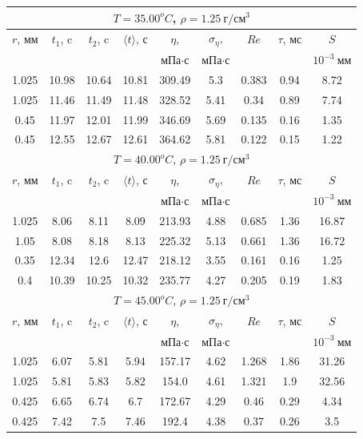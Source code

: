 \documentclass[12pt,a4paper]{article}
\begin{document}
\begin{table}[htp]
\begin{tabular}[]{|c|c|c|c|c|c|c|c|c|}
        \hline
        \multicolumn{9}{|c|}{$T = 35.00^oC$, $\rho = 1.25\ г/см^3$}\\
        \hline
        $r$, мм & $t_1$, c & $t_2$, c & $\langle t\rangle $, с & $\eta$,& $\sigma_{\eta}$,& $Re$ & $\tau$, мс & $S$\\
        &&&& мПа$\cdot$с & мПа$\cdot$с &&&$10^{-3}\ мм$\\
        \hline
        1.025  &  10.98 & 10.64 &  10.81  &  309.49  &  5.3  &  0.383  &  0.94  &  8.72 \\ 
        \hline
        1.025  &  11.46 & 11.49 &  11.48  &  328.52  &  5.41  &  0.34  &  0.89  &  7.74 \\ 
        \hline
        0.45  &  11.97 & 12.01 &  11.99  &  346.69  &  5.69  &  0.135  &  0.16  &  1.35 \\ 
        \hline
        0.45  &  12.55 & 12.67 &  12.61  &  364.62  &  5.81  &  0.122  &  0.15  &  1.22 \\ 
        \hline
        
        \hline
        \multicolumn{9}{|c|}{$T = 40.00^oC$, $\rho = 1.25\ г/см^3$}\\
        \hline
        $r$, мм & $t_1$, c & $t_2$, c & $\langle t\rangle $, с & $\eta$,& $\sigma_{\eta}$,& $Re$ & $\tau$, мс & $S$\\
        &&&& мПа$\cdot$с & мПа$\cdot$с &&&$10^{-3}\ мм$\\
        \hline
        1.025  &  8.06 & 8.11 &  8.09  &  213.93  &  4.88  &  0.685  &  1.36  &  16.87 \\ 
        \hline
        1.05  &  8.08 & 8.18 &  8.13  &  225.32  &  5.13  &  0.661  &  1.36  &  16.72 \\ 
        \hline
        0.35  &  12.34 & 12.6 &  12.47  &  218.12  &  3.55  &  0.161  &  0.16  &  1.25 \\ 
        \hline
        0.4  &  10.39 & 10.25 &  10.32  &  235.77  &  4.27  &  0.205  &  0.19  &  1.83 \\ 
        \hline
    
        \hline
        \multicolumn{9}{|c|}{$T = 45.00^oC$, $\rho = 1.25\ г/см^3$}\\
        \hline
        $r$, мм & $t_1$, c & $t_2$, c & $\langle t\rangle $, с & $\eta$,& $\sigma_{\eta}$,& $Re$ & $\tau$, мс & $S$\\
        &&&& мПа$\cdot$с & мПа$\cdot$с &&&$10^{-3}\ мм$\\
        \hline
        1.025  &  6.07 & 5.81 &  5.94  &  157.17  &  4.62  &  1.268  &  1.86  &  31.26 \\ 
        \hline
        1.025  &  5.81 & 5.83 &  5.82  &  154.0  &  4.61  &  1.321  &  1.9  &  32.56 \\ 
        \hline
        0.425  &  6.65 & 6.74 &  6.7  &  172.67  &  4.29  &  0.46  &  0.29  &  4.34 \\ 
        \hline
        0.425  &  7.42 & 7.5 &  7.46  &  192.4  &  4.38  &  0.37  &  0.26  &  3.5 \\ 
        \hline
    

\end{tabular}
\end{table}
\end{document}
